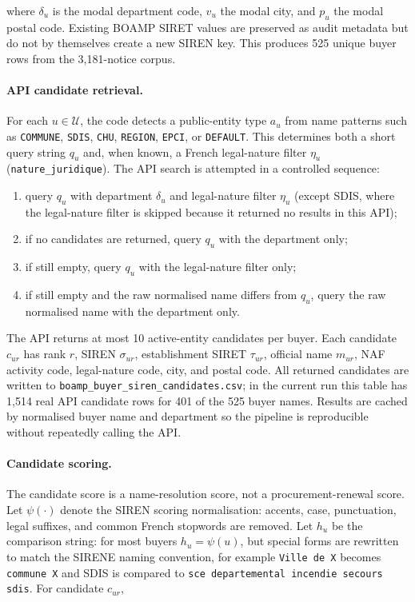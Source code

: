 \documentclass[12pt, a4paper]{article}
\begin{document}
\noindent where $\delta_u$ is the modal department code, $v_u$ the modal city,
and $p_u$ the modal postal code. Existing BOAMP SIRET values are preserved as
audit metadata but do not by themselves create a new SIREN key. This produces
525 unique buyer rows from the 3{,}181-notice corpus.

\paragraph{API candidate retrieval.}
For each $u\in\mathcal{U}$, the code detects a public-entity type
$a_u$ from name patterns such as \texttt{COMMUNE}, \texttt{SDIS}, \texttt{CHU},
\texttt{REGION}, \texttt{EPCI}, or \texttt{DEFAULT}. This determines both a
short query string $q_u$ and, when known, a French legal-nature filter
$\eta_u$ (\texttt{nature\_juridique}). The API search is attempted in a
controlled sequence:

\begin{enumerate}[leftmargin=*]
  \item query $q_u$ with department $\delta_u$ and legal-nature filter $\eta_u$
        (except SDIS, where the legal-nature filter is skipped because it
        returned no results in this API);
  \item if no candidates are returned, query $q_u$ with the department only;
  \item if still empty, query $q_u$ with the legal-nature filter only;
  \item if still empty and the raw normalised name differs from $q_u$, query
        the raw normalised name with the department only.
\end{enumerate}

The API returns at most 10 active-entity candidates per buyer. Each candidate
$c_{ur}$ has rank $r$, SIREN $\sigma_{ur}$, establishment SIRET $\tau_{ur}$,
official name $m_{ur}$, NAF activity code, legal-nature code, city, and postal
code. All returned candidates are written to
\nolinkurl{boamp_buyer_siren_candidates.csv}; in the current run this table has
1{,}514 real API candidate rows for 401 of the 525 buyer names. Results are
cached by normalised buyer name and department so the pipeline is reproducible
without repeatedly calling the API.

\paragraph{Candidate scoring.}
The candidate score is a name-resolution score, not a procurement-renewal score.
Let $\psi(\cdot)$ denote the SIREN scoring normalisation: accents, case,
punctuation, legal suffixes, and common French stopwords are removed. Let
$h_u$ be the comparison string: for most buyers $h_u=\psi(u)$, but special
forms are rewritten to match the SIRENE naming convention, for example
\texttt{Ville de X} becomes \texttt{commune X} and SDIS is compared to
\texttt{sce departemental incendie secours sdis}. For candidate $c_{ur}$,
\end{document}
